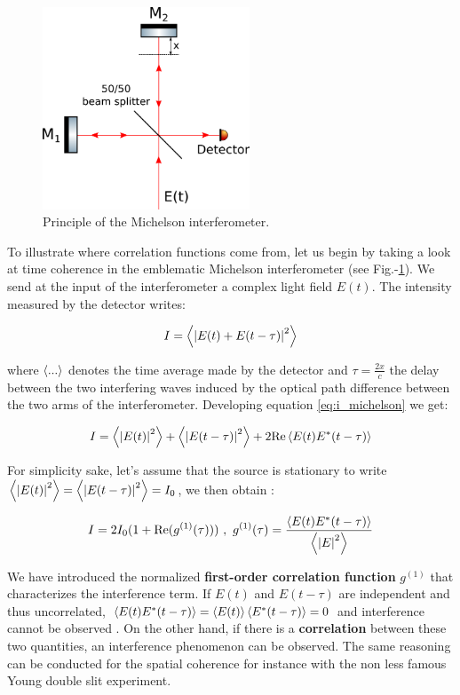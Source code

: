 \begin{figure}
    \centering
    \includegraphics[width=0.55\textwidth]{Fig/Chapter1/michelson.png}
    \caption{Principle of the Michelson interferometer.}
    \label{fig:michelson}
\end{figure}


To illustrate where correlation functions come from, let us begin by taking a look at time coherence in the emblematic Michelson interferometer (see Fig.-\ref{fig:michelson}). We send at the input of the interferometer a complex light field $E(t)$. The intensity measured by the detector writes:

\begin{equation}
    I=\left\langle\left\lvert E(t)+E(t-\tau)\right\rvert^2\right\rangle
    \label{eq:i_michelson}
\end{equation}

where $\left\langle...\right\rangle$ denotes the time average made by the detector and $\tau=\frac{2x}{c}$ the delay between the two interfering waves induced by the optical path difference between the two arms of the interferometer. Developing equation \ref{eq:i_michelson} we get:

\begin{equation}
    I=\left\langle\left\lvert E(t)\right\rvert^2\right\rangle + \left\langle\left\lvert E(t-\tau)\right\rvert^2\right\rangle + 2 {\rm{Re}} \left\langle E(t) E^*(t-\tau)\right\rangle
\end{equation}

For simplicity sake, let's assume that the source is stationary to write $\left\langle\left\lvert E(t)\right\rvert^2\right\rangle = \left\langle\left\lvert E(t-\tau)\right\rvert^2\right\rangle = I_0$, we then obtain :

\begin{equation}
    I= 2 I_0 (1 + {\rm{Re}} (g^{(1)} (\tau))) \ , \ g^{(1)} (\tau) = \frac{ \left\langle E(t) E^*(t-\tau)\right\rangle}{\left\langle\left\lvert E\right\rvert^2\right\rangle}
\end{equation}

We have introduced the normalized \textbf{first-order correlation function} $g^{(1)}$ that characterizes the interference term. If $E(t)$ and $E(t-\tau)$ are independent and thus uncorrelated, $\left\langle E(t) E^*(t-\tau)\right\rangle = \left\langle E(t)\right\rangle \left\langle E^*(t-\tau)\right\rangle=0$ and interference cannot be observed . On the other hand, if there is a \textbf{correlation} between these two quantities, an interference phenomenon can be observed. The same reasoning can be conducted for the spatial coherence for instance with the non less famous Young double slit experiment. 

